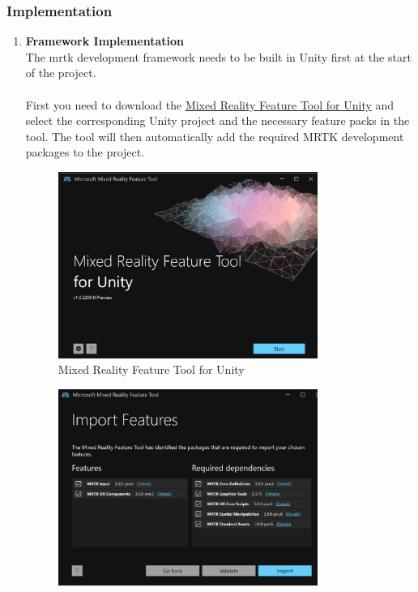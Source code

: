\documentclass[12pt]{article}
\begin{document}
\begin{enumerate}
\end{enumerate}
\subsubsection{Implementation}
\begin{enumerate}
      \item \textbf{Framework Implementation}
      \\
      The \gls{mrtk} development framework needs to be built in Unity first at the start of the project.
      \\\\
      First you need to download the \href{https://learn.microsoft.com/en-us/windows/mixed-reality/develop/unity/welcome-to-mr-feature-tool}{Mixed Reality Feature Tool for Unity} and select the corresponding Unity project and the necessary feature packs in the tool. The tool will then automatically add the required MRTK development packages to the project\cite{mrtk_m}.
      \begin{figure}[H]
            \centering
            \includegraphics[width=0.8\textwidth]{mrtk1.png}
            \caption{Mixed Reality Feature Tool for Unity\cite{mrtk_m}}
      \end{figure}
      \begin{figure}[H]
            \centering
            \includegraphics[width=0.8\textwidth]{mrtk2.png}

\end{figure}
\end{enumerate}
\end{document}
